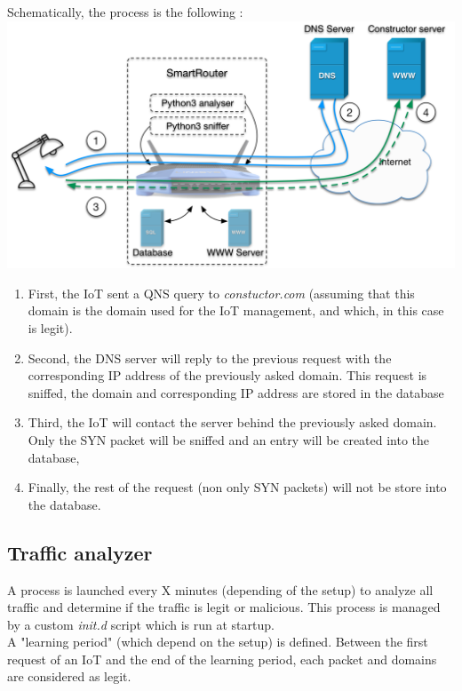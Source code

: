 \begin{frame}{}
\begin{multicols}{3}
Schematically, the process is the following : 
\includegraphics[width=\linewidth]{Pictures/dns.png}

\begin{enumerate}
\item First, the IoT sent a QNS query to \textit{constuctor.com} (assuming that this domain is the domain used for the IoT management, and which, in this case is legit). 
\item Second, the DNS server will reply to the previous request with the corresponding IP address of the previously asked domain. This request is sniffed, the domain and corresponding IP address are stored in the database
\item Third, the IoT will contact the server behind the previously asked domain. Only the SYN packet will be sniffed and an entry will be created into the database,
\item Finally, the rest of the request (non only SYN packets) will not be store into the database.
\end{enumerate}


\subsection{Traffic analyzer}

A process is launched every X minutes (depending of the setup) to analyze all traffic and determine if the traffic is legit or malicious. This process is managed by a custom \textit{init.d} script which is run at startup. \\


A "learning period" (which depend on the setup) is defined. Between the first request of an IoT and the end of the learning period, each packet and domains are considered as legit. \\



\end{multicols}
\end{frame}
